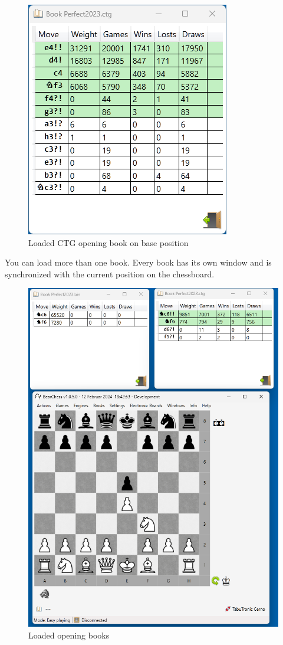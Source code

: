 \documentclass[11pt,a4paper]{article}
\begin{document}
	\begin{figure}[H]
		\centering
		\includegraphics[scale=1.0]{OpeningBook1.png}
		\caption{Loaded CTG opening book on base position }
		\label{fig:OpeningBook1}
	\end{figure}
	
	You can load more than one book. Every book has its own window and is synchronized with the current position on the chessboard.
	
	\begin{figure}[H]
		\centering
		\includegraphics[scale=0.7]{OpeningBook2.png}
		\caption{Loaded opening books }
		\label{fig:OpeningBook2}
	\end{figure}
	
\end{document}

